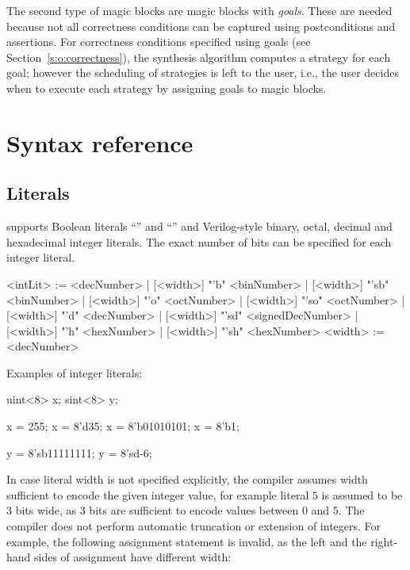 The second type of magic blocks are magic blocks with 
\emph{goals}.  These are needed because not all correctness 
conditions can be captured using postconditions and assertions.  
For correctness conditions specified using goals (see 
Section~\ref{s:o:correctness}), the synthesis algorithm computes a 
strategy for each goal; however the scheduling of strategies is 
left to the user, i.e., the user decides when to execute each 
strategy by assigning goals to magic blocks. 


\section{Syntax reference}

\subsection{Literals}\label{s:r:literals}

\tsl supports Boolean literals ``'' and ``'' 
and Verilog-style binary, octal, decimal and hexadecimal integer 
literals.  The exact number of bits can be specified for each 
integer literal.  

\begin{bnflisting}
<intLit> := <decNumber>
          | [<width>] "'b"  <binNumber>
          | [<width>] "'sb" <binNumber>
          | [<width>] "'o"  <octNumber>
          | [<width>] "'so" <octNumber>
          | [<width>] "'d"  <decNumber>
          | [<width>] "'sd" <signedDecNumber>
          | [<width>] "'h"  <hexNumber>
          | [<width>] "'sh" <hexNumber>
<width> := <decNumber>
\end{bnflisting}

Examples of integer literals:
\begin{tsllisting2}
uint<8> x;
sint<8> y;

x = 255;
x = 8'd35;
x = 8'b01010101;
x = 8'b1;

y = 8'sb11111111;
y = 8'sd-6;
\end{tsllisting2}

In case literal width is not specified explicitly, the compiler 
assumes width sufficient to encode the given integer value, for 
example literal $5$ is assumed to be $3$ bits wide, as $3$ bits 
are sufficient to encode values between $0$ and $5$.  The compiler 
does not perform automatic truncation or extension of integers.  
For example, the following assignment statement is invalid, as the 
left and the right-hand sides of assignment have different width:

